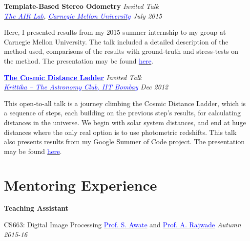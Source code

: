\documentclass[margin,line]{res}
\newenvironment{list1}{
  \begin{list}{\ding{113}}{%
      \setlength{\itemsep}{0in}
      \setlength{\parsep}{0in} \setlength{\parskip}{0in}
      \setlength{\topsep}{0in} \setlength{\partopsep}{0in} 
      \setlength{\leftmargin}{0.17in}}}{\end{list}}
\begin{document}
\begin{resume}
{\bf Template-Based Stereo Odometry} \hfill {\em Invited Talk} \\
{\em \href{http://theairlab.org/}{\textcolor{blue}{The AIR Lab}}, \href{http://www.cmu.edu/}{\textcolor{blue}{Carnegie Mellon University}} \hfill July 2015} \\
\vspace*{-.15in}
\begin{list1}
\item[] Here, I presented results from my 2015 summer internship to my group at Carnegie Mellon University. The talk included a detailed description of the method used, comparisons of the results with ground-truth and stress-tests on the method. The presentation may be found \href{http://alankarkotwal.github.io/intern_presentation.pptx}{\textcolor{blue} {here}}.
\end{list1}

{\bf \href{http://www.stab-iitb.org/krittika/the-cosmic-ladder-distance}{\textcolor{blue} {The Cosmic Distance Ladder}}} \hfill {\em Invited Talk} \\
{\em \href{http://www.stab-iitb.org/krittika/}{\textcolor{blue} {Krittika -- The Astronomy Club, IIT Bombay}} \hfill Dec 2012} \\
\vspace*{-.15in}
\begin{list1}
\item[] This open-to-all talk is a journey climbing the Cosmic Distance Ladder, which is a sequence of steps, each building on the previous step's results, for calculating distances in the universe. We begin with solar system distances, and end at huge distances where the only real option is to use photometric redshifts. This talk also presents results from my Google Summer of Code project. The presentation may be found \href{http://alankarkotwal.github.io/CosmicDistanceLadder.pptx}{\textcolor{blue} {here}}.
\end{list1}


\section{\sc Mentoring Experience}
\textbf{Teaching Assistant}
\begin{list1}
\item[]CS663: Digital Image Processing \hspace{0.5cm} \href{https://www.cse.iitb.ac.in/~suyash}{\textcolor{blue}{Prof. S. Awate}} and \href{https://www.cse.iitb.ac.in/~ajitvr}{\textcolor{blue}{Prof. A. Rajwade}} \hfill{\textit{Autumn 2015-16}}
\end{list1}


\end{resume}
\end{document}
